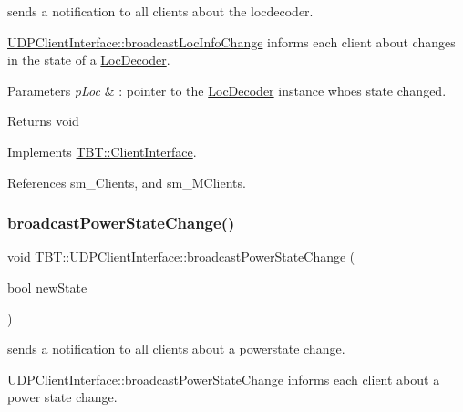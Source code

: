 sends a notification to all clients about the locdecoder. 

\hyperlink{classTBT_1_1UDPClientInterface_af4e63115b3156b151d4dfd50342b36e7_af4e63115b3156b151d4dfd50342b36e7}{U\+D\+P\+Client\+Interface\+::broadcast\+Loc\+Info\+Change} informs each client about changes in the state of a \hyperlink{classTBT_1_1LocDecoder}{Loc\+Decoder}.


\begin{DoxyParams}{Parameters}
{\em p\+Loc} & \+: pointer to the \hyperlink{classTBT_1_1LocDecoder}{Loc\+Decoder} instance whoes state changed.\\
\hline
\end{DoxyParams}
\begin{DoxyReturn}{Returns}
void 
\end{DoxyReturn}


Implements \hyperlink{classTBT_1_1ClientInterface_aaede3709fa0dcb23743f43d9c1a5ab04_aaede3709fa0dcb23743f43d9c1a5ab04}{T\+B\+T\+::\+Client\+Interface}.



References sm\+\_\+\+Clients, and sm\+\_\+\+M\+Clients.

\mbox{\label{classTBT_1_1UDPClientInterface_a60ddc3657a12b4e6c7ef7db0a31c9e3c_a60ddc3657a12b4e6c7ef7db0a31c9e3c}} 
\subsubsection{\texorpdfstring{broadcast\+Power\+State\+Change()}{broadcastPowerStateChange()}}
{\footnotesize\ttfamily void T\+B\+T\+::\+U\+D\+P\+Client\+Interface\+::broadcast\+Power\+State\+Change (\begin{DoxyParamCaption}\item[{bool}]{new\+State }\end{DoxyParamCaption})\hspace{0.3cm}{\ttfamily [virtual]}}



sends a notification to all clients about a powerstate change. 

\hyperlink{classTBT_1_1UDPClientInterface_a60ddc3657a12b4e6c7ef7db0a31c9e3c_a60ddc3657a12b4e6c7ef7db0a31c9e3c}{U\+D\+P\+Client\+Interface\+::broadcast\+Power\+State\+Change} informs each client about a power state change.


